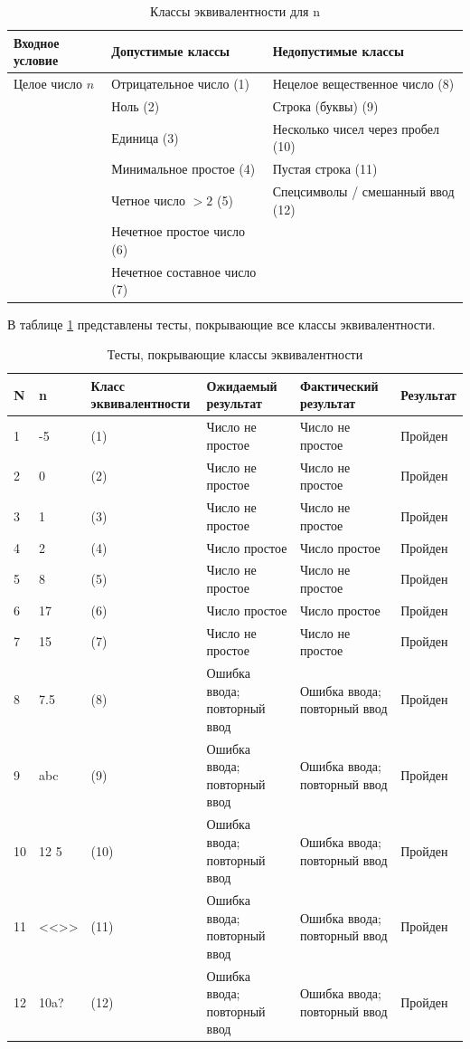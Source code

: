 \documentclass{article}[14pt]
\begin{document}
{\centering\large{
\begin{longtable}{|p{4.5cm}|p{5.5cm}|p{5.5cm}|}
	\caption{Классы эквивалентности для n}\\
	\hline
	Входное условие & Допустимые классы & Недопустимые классы \\ \hline
	Целое число $n$ & Отрицательное число (1) & Нецелое вещественное число (8) \\ \hline
	& Ноль (2) & Строка (буквы) (9) \\ \hline
	& Единица (3) & Несколько чисел через пробел (10) \\ \hline
	& Минимальное простое (4) & Пустая строка (11) \\ \hline
	& Четное число $>2$ (5) & Спецсимволы / смешанный ввод (12) \\ \hline
	& Нечетное простое число (6) & \\ \hline
	& Нечетное составное число (7) & \\ \hline
\end{longtable}}}

В таблице \ref{tab:test-black-box-equivalents} представлены тесты, покрывающие все классы эквивалентности.

{\centering\large{
\begin{longtable}{|p{0.4cm}|p{0.8cm}|p{3cm}|p{3.5cm}|p{3.5cm}|p{2cm}|}
	\caption{Тесты, покрывающие классы эквивалентности}
	\label{tab:test-black-box-equivalents}\\
	\hline
	N & n & Класс эквивалентности & Ожидаемый результат & Фактический результат & Результат \\ \hline
	1 & -5 & (1) & Число не простое & Число не простое & Пройден \\ \hline
	2 & 0 & (2) & Число не простое & Число не простое & Пройден \\ \hline
	3 & 1 & (3) & Число не простое & Число не простое & Пройден \\ \hline
	4 & 2 & (4) & Число простое & Число простое & Пройден \\ \hline
	5 & 8 & (5) & Число не простое & Число не простое & Пройден \\ \hline
	6 & 17 & (6) & Число простое & Число простое & Пройден \\ \hline
	7 & 15 & (7) & Число не простое & Число не простое & Пройден \\ \hline
	8 & 7.5 & (8) & Ошибка ввода; повторный ввод & Ошибка ввода; повторный ввод & Пройден \\ \hline
	9 & abc & (9) & Ошибка ввода; повторный ввод & Ошибка ввода; повторный ввод & Пройден \\ \hline
	10 & 12 5 & (10) & Ошибка ввода; повторный ввод & Ошибка ввода; повторный ввод & Пройден \\ \hline
	11 & <<>> & (11) & Ошибка ввода; повторный ввод & Ошибка ввода; повторный ввод & Пройден \\ \hline
	12 & 10a? & (12) & Ошибка ввода; повторный ввод & Ошибка ввода; повторный ввод & Пройден \\ \hline
\end{longtable}}}
\end{document}
